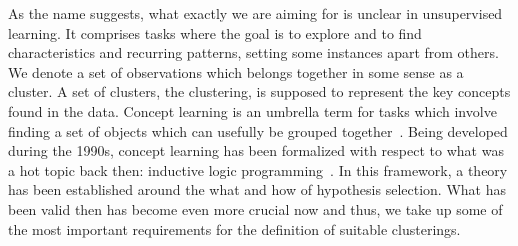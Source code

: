 As the name suggests, what exactly we are aiming for is unclear in unsupervised learning. It comprises tasks where the goal is to explore and to find characteristics and recurring patterns, setting some instances apart from others. We denote a set of observations which belongs together in some sense as a cluster. A set of clusters, the clustering, is supposed to represent the key concepts found in the data. Concept learning is an umbrella term for tasks which involve finding a set of objects which can usefully be grouped together~\citep{morik1993knowledge}. Being developed during the 1990s, concept learning has been formalized with respect to what was a hot topic back then: inductive logic programming~\citep{muggleton1994inductive}. In this framework, a theory has been established around the what and how of hypothesis selection. What has been valid then has become even more crucial now and thus, we take up some of the most important requirements for the definition of suitable clusterings. 
